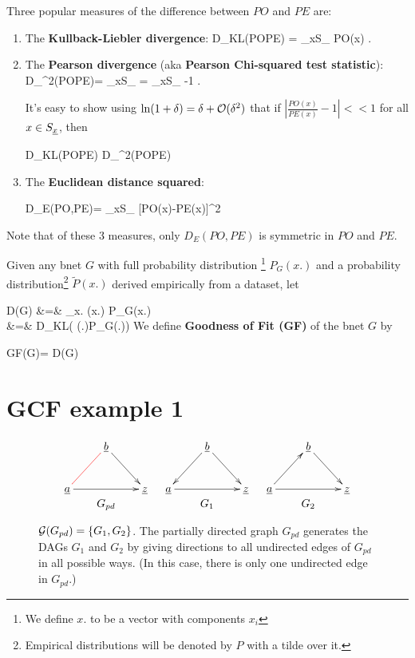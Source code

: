 Three popular
measures of
the difference between $PO$ and $PE$
are:
\begin{enumerate}
\item
The
{\bf Kullback-Liebler divergence}:
\beq
D_{KL}(PO\parallel PE) =
\sum_{x\in S_\rvx}
PO(x)\ln {}
\;.
\eeq
\item
The
{\bf Pearson divergence}
(aka {\bf Pearson Chi-squared test statistic}):
\beq
D_{\chi^2}(PO\parallel PE)=
\sum_{x\in S_\rvx}
=
\sum_{x\in S_\rvx}
-1
\;.
\eeq

It's easy to show 
using $\ln(1+\delta)=\delta +{\cal O}(\delta^2)$
that
if $\left|\frac{PO(x)}{PE(x)}-1\right|<<1$
for all $x\in S_{\underline{x}}$, then

\beq
D_{KL}(PO\parallel PE)\approx 
D_{\chi^2}(PO\parallel PE)
\eeq

\item
The {\bf Euclidean distance squared}:

\beq
D_E(PO,PE)=
\sum_{x\in S_\rvx}
[PO(x)-PE(x)]^2
\eeq
\end{enumerate}
Note that of these 3 measures,
only $D_E(PO, PE)$ is symmetric 
in $PO$ and $PE$.


Given any bnet $G$
with full probability
distribution
\footnote{We define
$x.$
to be a vector
with components $x_i$}
  $P_G(x.)$
and a
probability distribution\footnote{
Empirical distributions will 
be denoted by $P$ with a tilde over it.}
$\tilde{P}(x.)$
derived empirically from a dataset,
let

\beqa
D(G)
&=&
\sum_{x.}
(x.)\ln 
{}
{P_{G}(x.)}
\\
&=&
D_{KL}(
(\rvx.)\parallel P_{G}(\rvx.))
\eeqa
We define {\bf Goodness of Fit (GF)}
of the bnet $G$ by

\beq
GF(G)=\ln {}
{D(G)}
\eeq

\section{GCF example 1}

\begin{figure}[h!]
$$
\begin{array}{ccc}
\xymatrix{
&\rvb\ar@[red]@{-}[ld]\ar[dr]
\\
\rva\ar[rr]&&\rvz
}
&
\xymatrix{
&\rvb\ar[dl]\ar[dr]
\\
\rva\ar[rr]&&\rvz
}
&
\xymatrix{
&\rvb\ar[dr]
\\
\rva\ar[ur]\ar[rr]&&\rvz
}
\\
G_{pd}&G_1&G_2
\end{array}
$$
\caption{${\cal G}(G_{pd})=\{G_1, G_2\}$.
The partially directed graph $G_{pd}$
generates the DAGs $G_1$ and $G_2$
by giving directions to
all undirected edges of $G_{pd}$
in
all possible ways.
(In this case, there is only one
undirected edge in $G_{pd}$.) }
\label{fig-ob-eq-1}
\end{figure}

